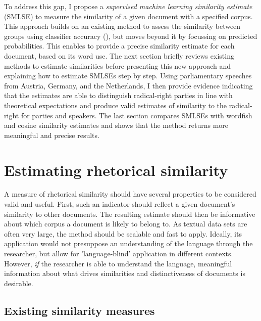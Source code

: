 \documentclass{article}
\begin{document}
To address this gap, I propose a \textit{supervised machine learning similarity estimate} (SMLSE) to measure the similarity of a given document with a specified corpus. This approach builds on an existing method to assess the similarity between groups using classifier accuracy (\cite{Peterson2018}), but moves beyond it by focussing on predicted probabilities. This enables to provide a precise similarity estimate for each document, based on its word use. The next section briefly reviews existing methods to estimate similarities before presenting this new approach and explaining how to estimate SMLSEs step by step. Using parliamentary speeches from Austria, Germany, and the Netherlands, I then provide evidence indicating that the estimates are able to distinguish radical-right parties in line with theoretical expectations and produce valid estimates of similarity to the radical-right for parties and speakers. The last section compares SMLSEs with wordfish and cosine similarity estimates and shows that the method returns more meaningful and precise results.\par


\section{Estimating rhetorical similarity}

A measure of rhetorical similarity should have several properties to be considered valid and useful. First, such an indicator should reflect a given document's similarity to other documents. The resulting estimate should then be informative about which corpus a document is likely to belong to. As textual data sets are often very large, the method should be scalable and fast to apply. Ideally, its application would not presuppose an understanding of the language through the researcher, but allow for 'language-blind' application in different contexts. However, \textit{if} the researcher is able to understand the language, meaningful information about what drives similarities and distinctiveness of documents is desirable. \par


\subsection{Existing similarity measures}
\end{document}
